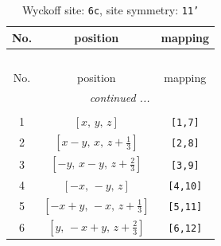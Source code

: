 \documentclass[fleqn,8pt]{jsarticle}
\begin{document}
\renewcommand{\arraystretch}{1.2}
\begin{longtable}{ccc}
\caption{Wyckoff site: {\tt 6c}, site symmetry: {\tt 11'}}
 \\
 \hline \hline
No. & position & mapping \\ \hline \endfirsthead

\multicolumn{2}{l}{\tablename\ \thetable{}} \\
 \hline \hline
No. & position & mapping \\ \hline \endhead

 \hline \hline
\multicolumn{2}{r}{\footnotesize\it continued ...} \\ \endfoot

 \hline \hline
\multicolumn{2}{r}{} \\ \endlastfoot

1 & $\left[ x,\, y,\, z \right]$ & {\tt [1,7]} \\ \hline
2 & $\left[ x - y,\, x,\, z + \frac{1}{3} \right]$ & {\tt [2,8]} \\ \hline
3 & $\left[ - y,\, x - y,\, z + \frac{2}{3} \right]$ & {\tt [3,9]} \\ \hline
4 & $\left[ - x,\, - y,\, z \right]$ & {\tt [4,10]} \\ \hline
5 & $\left[ - x + y,\, - x,\, z + \frac{1}{3} \right]$ & {\tt [5,11]} \\ \hline
6 & $\left[ y,\, - x + y,\, z + \frac{2}{3} \right]$ & {\tt [6,12]} \\
\end{longtable}
\end{document}
